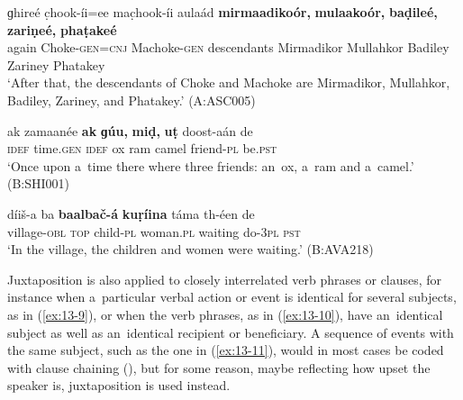 \begin{exe}
\ex
\label{ex:13-6}
\gll ɡhireé c̣hook-íi=ee mac̣hook-íi aulaád \textbf{mirmaadikoór,} \textbf{mulaakoór,} \textbf{baḍileé,} \textbf{zariṇeé,} \textbf{phaṭakeé} \\
again Choke-\textsc{gen=cnj} Machoke-\textsc{gen} descendants  Mirmadikor Mullahkor Badiley Zariney Phatakey \\
\glt `After that, the descendants of Choke and Machoke are Mirmadikor, Mullahkor, Badiley, Zariney, and Phatakey.' (A:ASC005)

\ex
\label{ex:13-7}
\gll ak zamaanée \textbf{ak} \textbf{ɡúu,} \textbf{miḍ,} \textbf{uṭ} doost-aán de \\
\textsc{idef} time.\textsc{gen} \textsc{ idef} ox ram camel friend-\textsc{pl}  be.\textsc{pst}  \\
\glt `Once upon a~time there where three friends: an~ox, a~ram and a~camel.' (B:SHI001)

\ex
\label{ex:13-8}
\gll díiš-a ba \textbf{baalbač-á} \textbf{kuṛíina} táma th-éen de \\
village-\textsc{obl} \textsc{top} child-\textsc{pl} woman.\textsc{pl} waiting do-\textsc{3pl} \textsc{pst}  \\
\glt `In the village, the children and women were waiting.' (B:AVA218) 
\end{exe}

Juxtaposition is also applied to closely interrelated verb phrases or clauses, for instance when a~particular verbal action or event is identical for several subjects, as in (\ref{ex:13-9}), or when the verb phrases, as in (\ref{ex:13-10}), have an~identical subject as well as an~identical recipient or beneficiary. A sequence of events with the same subject, such as the one in (\ref{ex:13-11}), would in most cases be coded with clause chaining (), but for some reason, maybe reflecting how upset the speaker is, juxtaposition is used instead.

